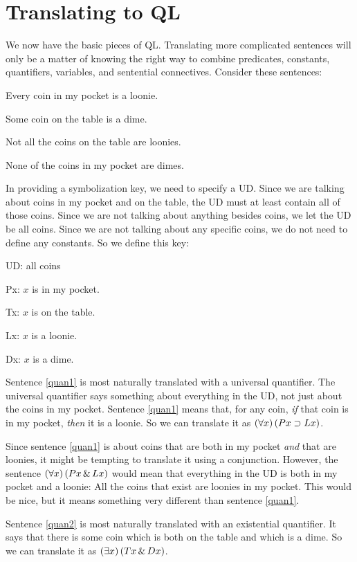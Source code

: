 \section{Translating to QL}
We now have the basic pieces of QL. Translating more complicated sentences will only be a matter of knowing the right way to combine predicates, constants, quantifiers, variables, and sentential connectives. Consider these sentences:
\begin{earg}
\item[\ex{quan1}] Every coin in my pocket is a loonie.
\item[\ex{quan2}] Some coin on the table is a dime.
\item[\ex{quan3}] Not all the coins on the table are loonies.
\item[\ex{quan4}] None of the coins in my pocket are dimes.
\end{earg}
In providing a symbolization key, we need to specify a UD. Since we are talking about coins in my pocket and on the table, the UD must at least contain all of those coins. Since we are not talking about anything besides coins, we let the UD be all coins. Since we are not talking about any specific coins, we do not need to define any constants. So we define this key:
\begin{ekey}
\item[UD:] all coins
\item[Px:] $x$ is in my pocket.
\item[Tx:] $x$ is on the table.
\item[Lx:] $x$ is a loonie.
\item[Dx:] $x$ is a dime.
\end{ekey}
Sentence \ref{quan1} is most naturally translated with a universal quantifier. The universal quantifier says something about everything in the UD, not just about the coins in my pocket. Sentence \ref{quan1} means that, for any coin, \emph{if} that coin is in my pocket, \emph{then} it is a loonie. So we can translate it as $(\forall x) \,(Px \supset Lx)$.

Since sentence \ref{quan1} is about coins that are both in my pocket \emph{and} that are loonies, it might be tempting to translate it using a conjunction. However, the sentence $(\forall x) \,(Px \,\&\, Lx)$ would mean that everything in the UD is both in my pocket and a loonie: All the coins that exist are loonies in my pocket. This would be nice, but it means something very different than sentence \ref{quan1}.

Sentence \ref{quan2} is most naturally translated with an existential quantifier. It says that there is some coin which is both on the table and which is a dime. So we can translate it as $(\exists x) \,(Tx \,\&\, Dx)$.

